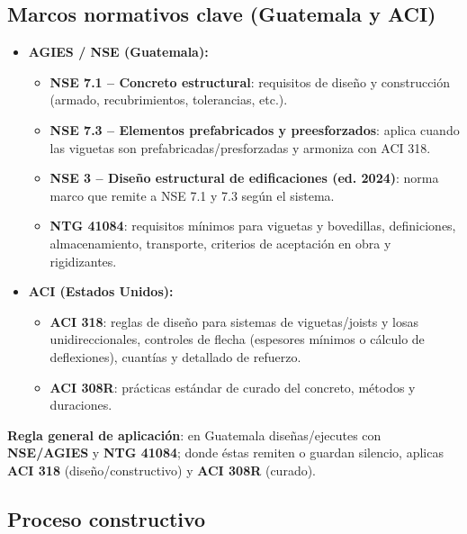 \documentclass[12pt]{article}
\begin{document}
	\subsection{Marcos normativos clave (Guatemala y ACI)}
	\begin{itemize}
		\item \textbf{AGIES / NSE (Guatemala):}
		\begin{itemize}
			\item \textbf{NSE 7.1 – Concreto estructural}: requisitos de diseño y construcción (armado, recubrimientos, tolerancias, etc.).
			\item \textbf{NSE 7.3 – Elementos prefabricados y preesforzados}: aplica cuando las viguetas son prefabricadas/presforzadas y armoniza con ACI 318.
			\item \textbf{NSE 3 – Diseño estructural de edificaciones (ed. 2024)}: norma marco que remite a NSE 7.1 y 7.3 según el sistema.
			\item \textbf{NTG 41084}: requisitos mínimos para viguetas y bovedillas, definiciones, almacenamiento, transporte, criterios de aceptación en obra y rigidizantes.
		\end{itemize}
		\item \textbf{ACI (Estados Unidos):}
		\begin{itemize}
			\item \textbf{ACI 318}: reglas de diseño para sistemas de viguetas/joists y losas unidireccionales, controles de flecha (espesores mínimos o cálculo de deflexiones), cuantías y detallado de refuerzo.
			\item \textbf{ACI 308R}: prácticas estándar de curado del concreto, métodos y duraciones.
		\end{itemize}
	\end{itemize}
	
	\textbf{Regla general de aplicación}: en Guatemala diseñas/ejecutes con \textbf{NSE/AGIES} y \textbf{NTG 41084}; donde éstas remiten o guardan silencio, aplicas \textbf{ACI 318} (diseño/constructivo) y \textbf{ACI 308R} (curado).
	
	\subsection{Proceso constructivo}
	
\end{document}
